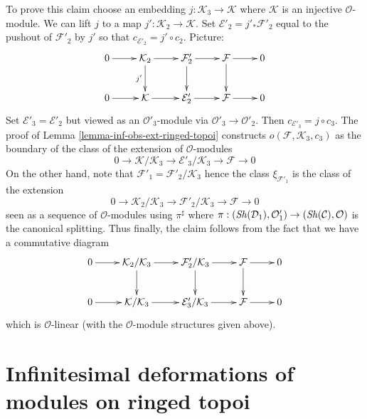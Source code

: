 \begin{remark}
\medskip\noindent
To prove this claim choose an embedding $j : \mathcal{K}_3 \to \mathcal{K}$
where $\mathcal{K}$ is an injective $\mathcal{O}$-module.
We can lift $j$ to a map $j' : \mathcal{K}_2 \to \mathcal{K}$.
Set $\mathcal{E}'_2 = j'_*\mathcal{F}'_2$ equal to the pushout
of $\mathcal{F}'_2$ by $j'$ so that $c_{\mathcal{E}'_2} = j' \circ c_2$.
Picture:
$$
\xymatrix{
0 \ar[r] &
\mathcal{K}_2 \ar[r] \ar[d]_{j'} &
\mathcal{F}'_2 \ar[r] \ar[d] &
\mathcal{F} \ar[r] \ar[d] & 0 \\
0 \ar[r] &
\mathcal{K} \ar[r] &
\mathcal{E}'_2 \ar[r] &
\mathcal{F} \ar[r] & 0
}
$$
Set $\mathcal{E}'_3 = \mathcal{E}'_2$ but viewed as an
$\mathcal{O}'_3$-module via $\mathcal{O}'_3 \to \mathcal{O}'_2$.
Then $c_{\mathcal{E}'_3} = j \circ c_3$.
The proof of Lemma \ref{lemma-inf-obs-ext-ringed-topoi} constructs
$o(\mathcal{F}, \mathcal{K}_3, c_3)$
as the boundary of the class of the extension of $\mathcal{O}$-modules
$$
0 \to
\mathcal{K}/\mathcal{K}_3 \to
\mathcal{E}'_3/\mathcal{K}_3 \to
\mathcal{F} \to 0
$$
On the other hand, note that $\mathcal{F}'_1 = \mathcal{F}'_2/\mathcal{K}_3$
hence the class $\xi_{\mathcal{F}'_1}$ is the class
of the extension
$$
0 \to \mathcal{K}_2/\mathcal{K}_3 \to \mathcal{F}'_2/\mathcal{K}_3
\to \mathcal{F} \to 0
$$
seen as a sequence of $\mathcal{O}$-modules using $\pi^\sharp$
where $\pi : (\mathop{\mathit{Sh}}\nolimits(\mathcal{D}_1), \mathcal{O}'_1) \to
(\mathop{\mathit{Sh}}\nolimits(\mathcal{C}), \mathcal{O})$ is the canonical splitting.
Thus finally, the claim follows from the fact that we have
a commutative diagram
$$
\xymatrix{
0 \ar[r] &
\mathcal{K}_2/\mathcal{K}_3 \ar[r] \ar[d] &
\mathcal{F}'_2/\mathcal{K}_3 \ar[r] \ar[d] &
\mathcal{F} \ar[r] \ar[d] & 0 \\
0 \ar[r] &
\mathcal{K}/\mathcal{K}_3 \ar[r] &
\mathcal{E}'_3/\mathcal{K}_3 \ar[r] &
\mathcal{F} \ar[r] & 0
}
$$
which is $\mathcal{O}$-linear (with the $\mathcal{O}$-module
structures given above).
\end{remark}







\section{Infinitesimal deformations of modules on ringed topoi}
\label{section-deformation-modules-ringed-topoi}

